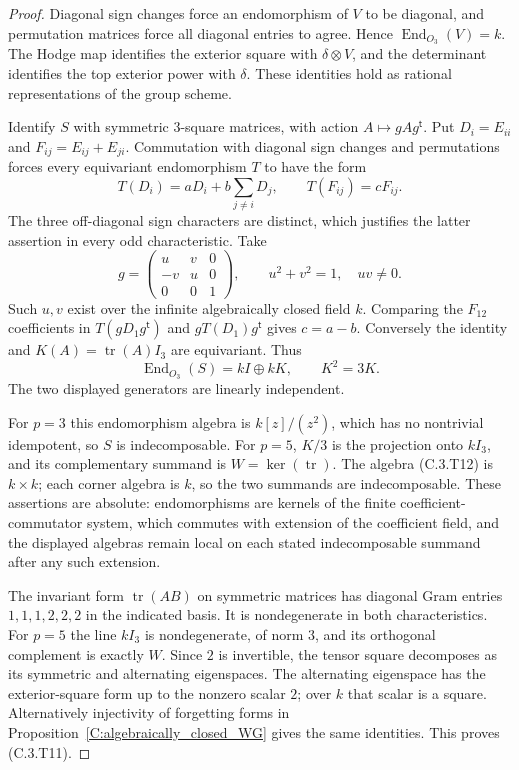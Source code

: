 \begin{proof}
Diagonal sign changes force an endomorphism of $V$ to be diagonal,
and permutation matrices force all diagonal entries to agree.
Hence $\operatorname{End}_{O_3}(V)=k$. The Hodge map identifies the
exterior square with $\delta\otimes V$, and the determinant identifies
the top exterior power with $\delta$. These identities hold as
rational representations of the group scheme.

Identify $S$ with symmetric $3$-square matrices, with action
$A\mapsto gAg^{\mathsf t}$. Put $D_i=E_{ii}$ and
$F_{ij}=E_{ij}+E_{ji}$. Commutation with diagonal sign changes and
permutations forces every equivariant endomorphism $T$ to have the form
\[
 T(D_i)=aD_i+b\sum_{j\ne i}D_j,\qquad T(F_{ij})=cF_{ij}.
\]
The three off-diagonal sign characters are distinct, which justifies
the latter assertion in every odd characteristic. Take
\[
 g=\begin{pmatrix}u&v&0\\-v&u&0\\0&0&1\end{pmatrix},
 \qquad u^2+v^2=1,\quad uv\ne0 .
\]
Such $u,v$ exist over the infinite algebraically closed field $k$.
Comparing the $F_{12}$ coefficients in $T(gD_1g^{\mathsf t})$ and
$gT(D_1)g^{\mathsf t}$ gives $c=a-b$. Conversely the identity and
$K(A)=\operatorname{tr}(A)I_3$ are equivariant. Thus
\[
 \operatorname{End}_{O_3}(S)=kI\oplus kK,\qquad K^2=3K.    \tag{C.3.T12}
\]
The two displayed generators are linearly independent.

For $p=3$ this endomorphism algebra is $k[z]/(z^2)$, which has no
nontrivial idempotent, so $S$ is indecomposable. For $p=5$, $K/3$
is the projection onto $kI_3$, and its complementary summand is
$W=\ker(\operatorname{tr})$. The algebra (C.3.T12) is $k\times k$;
each corner algebra is $k$, so the two summands are indecomposable.
These assertions are absolute: endomorphisms are kernels of the
finite coefficient-commutator system, which commutes with extension
of the coefficient field, and the displayed algebras remain local
on each stated indecomposable summand after any such extension.

The invariant form $\operatorname{tr}(AB)$ on symmetric matrices
has diagonal Gram entries $1,1,1,2,2,2$ in the indicated basis.
It is nondegenerate in both characteristics. For $p=5$ the line
$kI_3$ is nondegenerate, of norm $3$, and its orthogonal complement
is exactly $W$. Since $2$ is invertible, the tensor square decomposes
as its symmetric and alternating eigenspaces. The alternating
eigenspace has the exterior-square form up to the nonzero scalar
$2$; over $k$ that scalar is a square. Alternatively injectivity of
forgetting forms in Proposition~\ref{C:algebraically_closed_WG} gives
the same identities. This proves (C.3.T11).


\end{proof}
